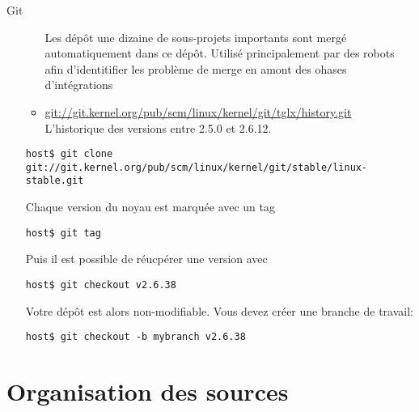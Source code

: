 \begin{frame}[fragile=singleslide]{Git}
\begin{itemize}
\begin{itemize}
        Les dépôt  une dizaine  de sous-projets importants  sont mergé
        automatiquement dans ce  dépôt. Utilisé principalement par des
        robots afin d'identitifier les  problème de merge en amont des
        ohases d'intégrations
      \item
        \url{git://git.kernel.org/pub/scm/linux/kernel/git/tglx/history.git}
        L'historique des versions entre 2.5.0 et 2.6.12.
      \end{itemize} 
      \begin{lstlisting} 
host$ git clone git://git.kernel.org/pub/scm/linux/kernel/git/stable/linux-stable.git
      \end{lstlisting} 
      Chaque version du noyau est marquée avec un tag
      \begin{lstlisting} 
host$ git tag
      \end{lstlisting} 
      Puis il est possible de réucpérer une version avec
      \begin{lstlisting}
host$ git checkout v2.6.38
      \end{lstlisting}
      Votre  dépôt  est alors  non-modifiable.  Vous  devez créer  une
      branche de travail:
      \begin{lstlisting}
host$ git checkout -b mybranch v2.6.38
      \end{lstlisting}
    \end{itemize}  
\end{frame}

\section{Organisation des sources}

